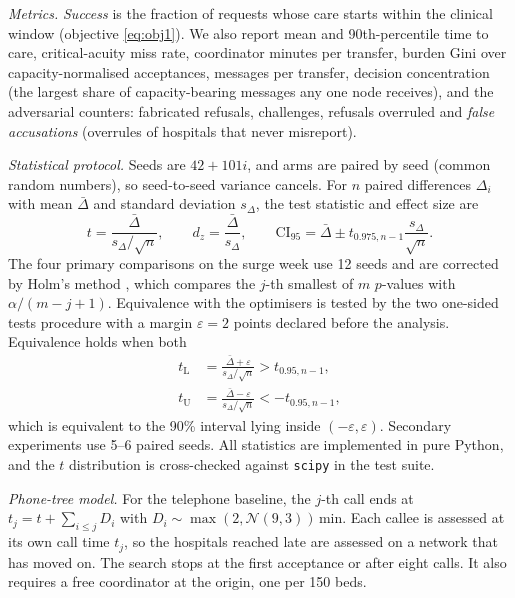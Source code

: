 \emph{Metrics.} \emph{Success} is the fraction of requests whose care starts within the clinical window (objective \eqref{eq:obj1}). We also report mean and 90th-percentile time to care, critical-acuity miss rate, coordinator minutes per transfer, burden Gini over capacity-normalised acceptances, messages per transfer, decision concentration (the largest share of capacity-bearing messages any one node receives), and the adversarial counters: fabricated refusals, challenges, refusals overruled and \emph{false accusations} (overrules of hospitals that never misreport).

\emph{Statistical protocol.} Seeds are $42+101i$, and arms are paired by seed (common random numbers), so seed-to-seed variance cancels. For $n$ paired differences $\Delta_i$ with mean $\bar\Delta$ and standard deviation $s_\Delta$, the test statistic and effect size are
\begin{equation}
  t=\frac{\bar\Delta}{s_\Delta/\sqrt{n}},\qquad d_z=\frac{\bar\Delta}{s_\Delta},\qquad \mathrm{CI}_{95}=\bar\Delta\pm t_{0.975,n-1}\frac{s_\Delta}{\sqrt n}.
  \label{eq:ttest}
\end{equation}
The four primary comparisons on the surge week use 12 seeds and are corrected by Holm's method \cite{holm1979simple}, which compares the $j$-th smallest of $m$ $p$-values with $\alpha/(m-j+1)$. Equivalence with the optimisers is tested by the two one-sided tests procedure \cite{schuirmann1987tost,lakens2017equivalence} with a margin $\varepsilon=2$ points declared before the analysis. Equivalence holds when both
\begin{equation}
\begin{aligned}
  t_{\mathrm{L}}&=\frac{\bar\Delta+\varepsilon}{s_\Delta/\sqrt n}>t_{0.95,n-1},\\
  t_{\mathrm{U}}&=\frac{\bar\Delta-\varepsilon}{s_\Delta/\sqrt n}<-t_{0.95,n-1},
\end{aligned}
  \label{eq:tost}
\end{equation}
which is equivalent to the 90\% interval lying inside $(-\varepsilon,\varepsilon)$. Secondary experiments use 5--6 paired seeds. All statistics are implemented in pure Python, and the $t$ distribution is cross-checked against \texttt{scipy} in the test suite.

\emph{Phone-tree model.} For the telephone baseline, the $j$-th call ends at $t_j=t+\sum_{i\le j}D_i$ with $D_i\sim\max(2,\mathcal{N}(9,3))$\,min. Each callee is assessed at its own call time $t_j$, so the hospitals reached late are assessed on a network that has moved on. The search stops at the first acceptance or after eight calls. It also requires a free coordinator at the origin, one per 150 beds.

